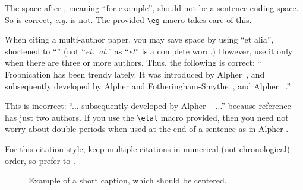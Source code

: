 The space after \eg, meaning ``for example'', should not be a sentence-ending space.
So \eg is correct, {\em e.g.} is not.
The provided \verb'\eg' macro takes care of this.

When citing a multi-author paper, you may save space by using ``et alia'', shortened to ``\etal'' (not ``{\em et.\ al.}'' as ``{\em et}'' is a complete word.)
However, use it only when there are three or more authors.
Thus, the following is correct: ``
Frobnication has been trendy lately.
It was introduced by Alpher~\cite{Alpher02}, and subsequently developed by Alpher and Fotheringham-Smythe~\cite{Alpher03}, and Alpher \etal~\cite{Alpher04}.''

This is incorrect: ``... subsequently developed by Alpher \etal~\cite{Alpher03} ...''
because reference~\cite{Alpher03} has just two authors.  If you use the
\verb'\etal' macro provided, then you need not worry about double periods
when used at the end of a sentence as in Alpher \etal.

For this citation style, keep multiple citations in numerical (not
chronological) order, so prefer \cite{Alpher03,Alpher02,Authors14} to
\cite{Alpher02,Alpher03,Authors14}.


\begin{figure}
\begin{center}
\fbox{\rule{0pt}{2in} \rule{.9\linewidth}{0pt}}
\end{center}
   \caption{Example of a short caption, which should be centered.}
\label{fig:short}
\end{figure}